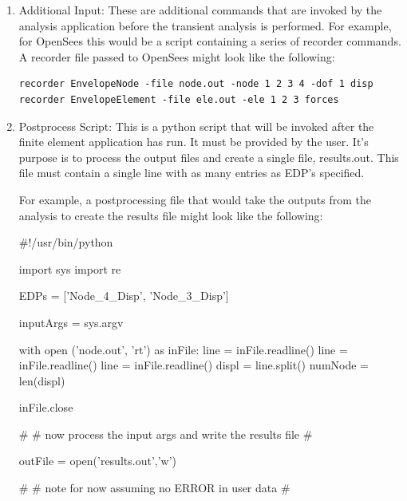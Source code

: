 \begin{enumerate}
\item Additional Input: These are additional commands that are invoked
  by the analysis application before the transient analysis is
  performed. For example, for OpenSees this would be a script
  containing a series of recorder commands. \\

A recorder file passed to OpenSees might look like the following:
\begin{verbatim}
recorder EnvelopeNode -file node.out -node 1 2 3 4 -dof 1 disp
recorder EnvelopeElement -file ele.out -ele 1 2 3 forces
\end{verbatim}

\item Postprocess Script: This is a python script that will be invoked
  after the finite element application has run. It must be provided by
  the user. It's purpose is to process the output files and create a
  single file, results.out. This file must contain a single line with
  as many entries as EDP's specified.

For example, a postprocessing file that would take the outputs from the analysis to create the results file might look like the following:

\begin{python}
#!/usr/bin/python                                                                 

import sys
import re

EDPs = ['Node_4_Disp', 'Node_3_Disp']

inputArgs = sys.argv

with open ('node.out', 'rt') as inFile:
    line = inFile.readline()
    line = inFile.readline()
    line = inFile.readline()
    displ = line.split()
    numNode = len(displ)

inFile.close

#                                                                                 
# now process the input args and write the results file                           
#                                                                                 

outFile = open('results.out','w')

#                                                                                 
# note for now assuming no ERROR in user data                                     
#                                                                                 


\end{python}
\end{enumerate}
